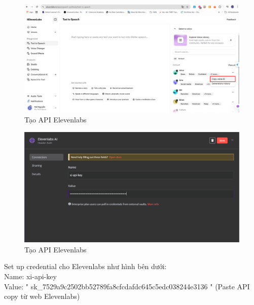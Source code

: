 \begin{itemize}[label=]
 \begin{figure}[H]
    \centering
    \includegraphics[width=1\textwidth]{images/Elevenlabs-4.pdf}
    \caption{Tạo API Elevenlabs}
    
    \end{figure}

 \begin{figure}[H]
    \centering
    \includegraphics[width=1\textwidth]{images/Elevenlabs-5.png}
    \caption{Tạo API Elevenlabs}
    
    \end{figure}
    Set up credential cho Elevenlabs như hình bên dưới:\\
    Name: xi-api-key\\
    Value: " sk\_7529a9c2502bb52789fa8cfcdafdc645c5edc038244e3136 " (Paste API copy từ web Elevenlabs) \\

\end{itemize}


